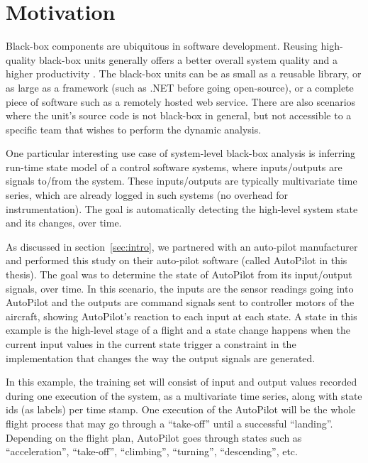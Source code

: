 \chapter{Motivation} \label{sec:motivation}
Black-box components are ubiquitous in software development. Reusing high-quality black-box units generally offers a better overall system quality and a higher productivity \cite{edwards2001framework}.  The black-box units can be as small as a reusable library, or as large as a framework (such as .NET before going open-source), or a complete piece of software such as a remotely hosted web service. There are also scenarios where the unit's source code is not black-box in general, but not accessible to a specific team that wishes to perform the dynamic analysis. 

One particular interesting use case of system-level black-box analysis is inferring run-time state model of a control software systems, where inputs/outputs are signals to/from the system. These inputs/outputs are typically multivariate time series, which are already logged in such systems (no overhead for instrumentation). The goal is automatically detecting the high-level system state and its changes, over time.

As discussed in section~\ref{sec:intro}, we partnered with an auto-pilot manufacturer and performed this study on their auto-pilot software (called AutoPilot in this thesis). The goal was to determine the state of AutoPilot from its input/output signals, over time. In this scenario, the inputs are the sensor readings going into AutoPilot and the outputs are command signals sent to controller motors of the aircraft, showing AutoPilot's reaction to each input at each state. A state in this example is the high-level stage of a flight and a state change happens when the current input values in the current state trigger a constraint in the implementation that changes the way the output signals are generated. %

In this example, the training set will consist of input and output values recorded during one execution of the system, as a multivariate time series, along with state ids (as labels) per time stamp. One execution of the AutoPilot will be the whole flight process that may go through a ``take-off'' until a successful ``landing''. Depending on the flight plan, AutoPilot goes through states such as ``acceleration'', ``take-off'', ``climbing'', ``turning'', ``descending'', etc. 

